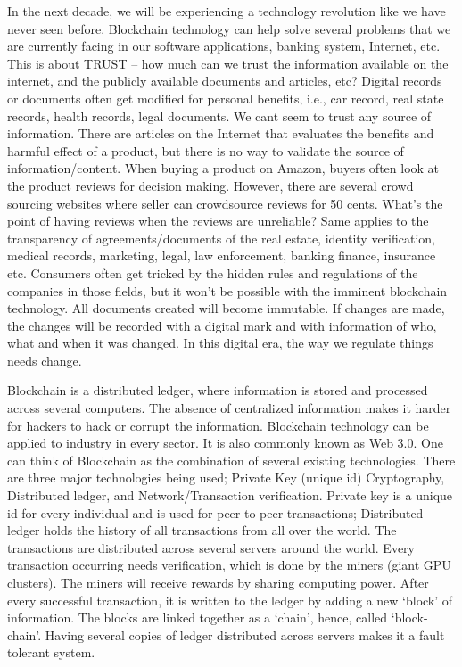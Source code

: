 \documentclass[DIV=calc, paper=a4, fontsize=11pt, twocolumn]{scrartcl}	 %
\begin{document}
  In the next decade, we will be experiencing a technology revolution like we have never seen before. Blockchain technology can help solve several problems that we are currently facing in our software applications, banking system, Internet, etc. This is about TRUST – how much can we trust the information available on the internet, and the publicly available documents and articles, etc? Digital records or documents often get modified for personal benefits, i.e., car record, real state records, health records, legal documents. We can\textquotesingle t seem to trust any source of information. There are articles on the Internet that evaluates the benefits and harmful effect of a product, but there is no way to validate the source of information/content. When buying a product on Amazon, buyers often look at the product reviews for decision making. However, there are several crowd sourcing websites where seller can crowdsource reviews for 50 cents. What’s the point of having reviews when the reviews are unreliable? Same applies to the transparency of agreements/documents of the real estate, identity verification, medical records, marketing, legal, law enforcement, banking finance, insurance etc. Consumers often get tricked by the hidden rules and regulations of the companies in those fields, but it won’t be possible with the imminent blockchain technology. All documents created will become immutable. If changes are made, the changes will be recorded with a digital mark and with information of who, what and when it was changed. In this digital era, the way we regulate things needs change.
  
Blockchain is a distributed ledger, where information is stored and processed across several computers. The absence of centralized information makes it harder for hackers to hack or corrupt the information. Blockchain technology can be applied to industry in every sector. It is also commonly known as Web 3.0. One can think of Blockchain as the combination of several existing technologies. There are three major technologies being used; Private Key (unique id) Cryptography, Distributed ledger, and Network/Transaction verification. Private key is a unique id for every individual and is used for peer-to-peer transactions; Distributed ledger holds the history of all transactions from all over the world. The transactions are distributed across several servers around the world. Every transaction occurring needs verification, which is done by the miners (giant GPU clusters). The miners will receive rewards by sharing computing power. After every successful transaction, it is written to the ledger by adding a new `block' of information. The blocks are linked together as a `chain', hence, called `block-chain'. Having several copies of ledger distributed across servers makes it a fault tolerant system.
\end{document}
